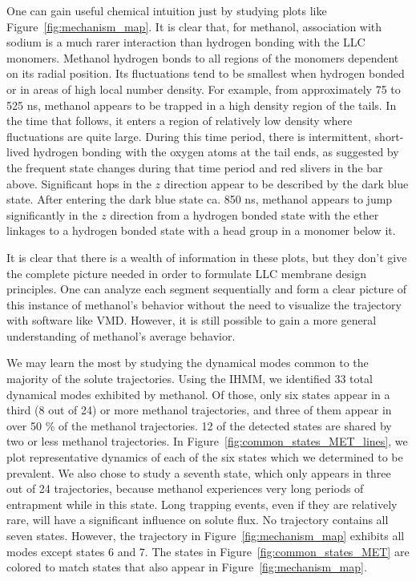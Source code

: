 \documentclass{article}
\begin{document}
  One can gain useful chemical intuition just by studying plots like
  Figure~\ref{fig:mechanism_map}. It is clear that, for methanol, association 
  with sodium is a much rarer interaction than hydrogen bonding with the 
  LLC monomers. Methanol hydrogen bonds to all regions of the monomers dependent
  on its radial position. Its fluctuations tend to be smallest when hydrogen bonded
  or in areas of high local number density. For example, from approximately 75 to 
  525 ns, methanol appears to be trapped in a high density region of the tails.
  In the time that follows, it enters a region of relatively low density where 
  fluctuations are quite large. During this time period, there is intermittent, 
  short-lived hydrogen bonding with the oxygen atoms at the tail ends, as suggested
  by the frequent state changes during that time period and red slivers in the bar
  above. Significant hops in the $z$ direction appear to be described by the dark blue
  state. After entering the dark blue state ca. 850 ns, methanol appears to jump
  significantly in the $z$ direction from a hydrogen bonded state with the ether 
  linkages to a hydrogen bonded state with a head group in a monomer below it.

  It is clear that there is a wealth of information in these plots, but they don't give
  the complete picture needed in order to formulate LLC membrane design principles. One
  can analyze each segment sequentially and form a clear picture of this instance of 
  methanol's behavior without the need to visualize the trajectory with software like VMD.
  However, it is still possible to gain a more general understanding of methanol's average
  behavior.
  
  We may learn the most by studying the dynamical modes common to the majority of 
  the solute trajectories. Using the IHMM, we identified 33 total dynamical modes 
  exhibited by methanol. Of those, only six states appear in a third (8 out of 24) 
  or more methanol trajectories, and three of them appear in over 50 \% of the 
  methanol trajectories. 12 of the detected states are shared by two or less 
  methanol trajectories. In Figure~\ref{fig:common_states_MET_lines}, we plot 
  representative dynamics of each of the six states which we determined to be prevalent.
  We also chose to study a seventh state, which only appears in three out of
  24 trajectories, because methanol experiences very long periods of entrapment
  while in this state. Long trapping events, even if they are relatively rare, will
  have a significant influence on solute flux. No trajectory contains all seven states.
  However, the trajectory in Figure~\ref{fig:mechanism_map} exhibits all modes except
  states 6 and 7. The states in Figure~\ref{fig:common_states_MET} are colored to match
  states that also appear in Figure~\ref{fig:mechanism_map}.
    
\end{document}
